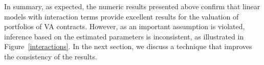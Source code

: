 


In summary, as expected, the numeric results presented above confirm that linear models with interaction terms provide excellent results for the valuation of portfolios of VA contracts. However, as an important assumption is violated, inference based on the estimated parameters is inconsistent, as illustrated in Figure~\ref{interactions}. In the next section, we discuss a technique that improves the consistency of the results.




